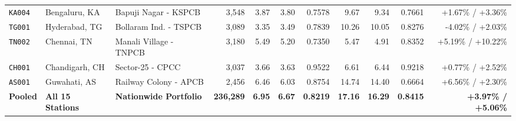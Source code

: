 \begin{table}[t]
\begin{tabular}{lllrrrrrrrr}
\texttt{KA004} & Bengaluru, KA & Bapuji Nagar - KSPCB & 3,548 & 3.87 & 3.80 & 0.7578 & 9.67 & 9.34 & 0.7661 & +1.67\% / +3.36\% \\
\texttt{TG001} & Hyderabad, TG & Bollaram Ind. - TSPCB & 3,089 & 3.35 & 3.49 & 0.7839 & 10.26 & 10.05 & 0.8276 & -4.02\% / +2.03\% \\
\texttt{TN002} & Chennai, TN & Manali Village - TNPCB & 3,180 & 5.49 & 5.20 & 0.7350 & 5.47 & 4.91 & 0.8352 & +5.19\% / +10.22\% \\
\texttt{CH001} & Chandigarh, CH & Sector-25 - CPCC & 3,037 & 3.66 & 3.63 & 0.9522 & 6.61 & 6.44 & 0.9218 & +0.77\% / +2.52\% \\
\texttt{AS001} & Guwahati, AS & Railway Colony - APCB & 2,456 & 6.46 & 6.03 & 0.8754 & 14.74 & 14.40 & 0.6664 & +6.56\% / +2.30\% \\
\midrule
\textbf{Pooled} & \textbf{All 15 Stations} & \textbf{Nationwide Portfolio} & \textbf{236,289} & \textbf{6.95} & \textbf{6.67} & \textbf{0.8219} & \textbf{17.16} & \textbf{16.29} & \textbf{0.8415} & \textbf{+3.97\% / +5.06\%} \\
\bottomrule
\end{tabular}
\end{table}

